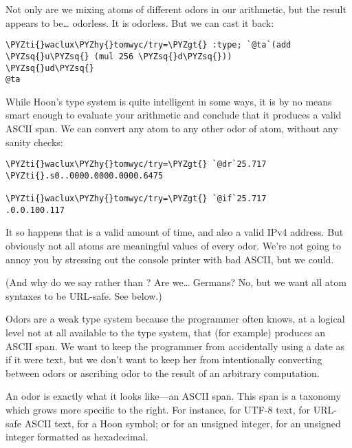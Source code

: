 Not only are we mixing atoms of different odors in our
arithmetic, but the result appears to be\ldots{} odorless.  It is
odorless.  But we can cast it back:

\begin{framed_shaded}
\begin{Verbatim}[fontsize=\relsize{-2.5},fontseries=b,commandchars=\\\{\}]
\PYZti{}waclux\PYZhy{}tomwyc/try=\PYZgt{} :type; `@ta`(add \PYZsq{}u\PYZsq{} (mul 256 \PYZsq{}d\PYZsq{}))
\PYZsq{}ud\PYZsq{}
@ta
\end{Verbatim}
\end{framed_shaded}

While Hoon's type system is quite intelligent in some ways, it is
by no means smart enough to evaluate your arithmetic and conclude
that it produces a valid ASCII span.  We can convert any atom to
any other odor of atom, without any sanity checks:

\begin{framed_shaded}
\begin{Verbatim}[fontsize=\relsize{-2.5},fontseries=b,commandchars=\\\{\}]
\PYZti{}waclux\PYZhy{}tomwyc/try=\PYZgt{} `@dr`25.717
\PYZti{}.s0..0000.0000.0000.6475

\PYZti{}waclux\PYZhy{}tomwyc/try=\PYZgt{} `@if`25.717
.0.0.100.117
\end{Verbatim}
\end{framed_shaded}

It so happens that  is a valid amount of time, and also a
valid IPv4 address.  But obviously not all atoms are meaningful
values of every odor.  We're not going to annoy you by stressing
out the console printer with bad ASCII, but we could.

(And why do we say  rather than ?  Are we\ldots{}
Germans?  No, but we want all atom syntaxes to be URL-safe.
See below.)

Odors are a weak type system because the programmer often knows,
at a logical level not at all available to the type system, that
(for example)  produces an ASCII span.
We want to keep the programmer from accidentally using a date as
if it were text, but we don't want to keep her from intentionally
converting between odors or ascribing odor to the result of an
arbitrary computation.

An odor is exactly what it looks like---an ASCII span.  This span
is a taxonomy which grows more specific to the right.  For
instance,  for UTF-8 text,  for URL-safe ASCII text,
 for a Hoon symbol; or  for an unsigned integer, 
for an unsigned integer formatted as hexadecimal.

